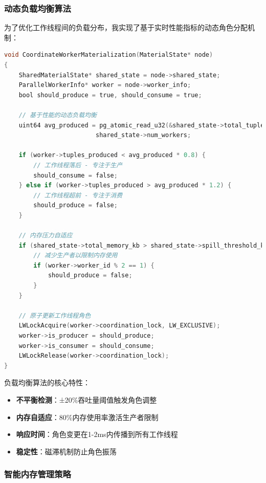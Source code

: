 \subsubsection{动态负载均衡算法}

为了优化工作线程间的负载分布，我实现了基于实时性能指标的动态角色分配机制：

\begin{lstlisting}[language=C, caption=动态负载均衡核心逻辑]
void CoordinateWorkerMaterialization(MaterialState* node)
{
    SharedMaterialState* shared_state = node->shared_state;
    ParallelWorkerInfo* worker = node->worker_info;
    bool should_produce = true, should_consume = true;
    
    // 基于性能的动态负载均衡
    uint64 avg_produced = pg_atomic_read_u32(&shared_state->total_tuples) /
                         shared_state->num_workers;
    
    if (worker->tuples_produced < avg_produced * 0.8) {
        // 工作线程落后 - 专注于生产
        should_consume = false;
    } else if (worker->tuples_produced > avg_produced * 1.2) {
        // 工作线程超前 - 专注于消费
        should_produce = false;
    }
    
    // 内存压力自适应
    if (shared_state->total_memory_kb > shared_state->spill_threshold_kb) {
        // 减少生产者以限制内存使用
        if (worker->worker_id % 2 == 1) {
            should_produce = false;
        }
    }
    
    // 原子更新工作线程角色
    LWLockAcquire(worker->coordination_lock, LW_EXCLUSIVE);
    worker->is_producer = should_produce;
    worker->is_consumer = should_consume;
    LWLockRelease(worker->coordination_lock);
}
\end{lstlisting}

负载均衡算法的核心特性：
\begin{itemize}
    \item \textbf{不平衡检测}：±20\%吞吐量阈值触发角色调整
    \item \textbf{内存自适应}：80\%内存使用率激活生产者限制
    \item \textbf{响应时间}：角色变更在1-2ms内传播到所有工作线程
    \item \textbf{稳定性}：磁滞机制防止角色振荡
\end{itemize}

\subsubsection{智能内存管理策略}

